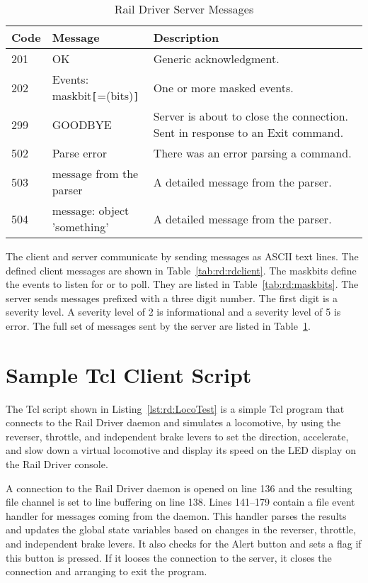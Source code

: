 \begin{table}[hbpt]
\begin{centering}  
\begin{tabular}{|l|l|p{2in}|}
\hline
\textbf{Code} & \textbf{Message} & \textbf{Description} \\
\hline
\hline
201 & OK & Generic acknowledgment.\\
\hline
202 & Events: maskbit\verb=[==(bits)\verb=]=& One or more masked events.\\
\hline
299 & GOODBYE & Server is about to close the connection.  Sent in
response to an Exit command.\\
\hline
502 & Parse error& There was an error parsing a command.\\
\hline
503 & message from the parser& A detailed message from the parser.\\
\hline
504 & message: object 'something'& A detailed message from the parser.\\
\hline
\end{tabular}
\caption{Rail Driver Server Messages}
\label{tab:rd:rdserver}
\end{centering}
\end{table}
The client and server communicate by sending messages as ASCII text
lines.  The defined client messages are shown in
Table~\ref{tab:rd:rdclient}. The maskbits define the events to listen for
or to poll.  They are listed in Table~\ref{tab:rd:maskbits}. The server
sends messages prefixed with a three digit number.  The first digit is a
severity level. A severity level of 2 is informational and a
severity level of 5 is error.  The full set of messages sent by the
server are listed in Table~\ref{tab:rd:rdserver}.

\section{Sample Tcl Client Script}


The Tcl script shown in Listing~\ref{lst:rd:LocoTest} is a simple Tcl program
that connects to the Rail Driver daemon and simulates a locomotive, by
using the reverser, throttle, and independent brake levers to set the
direction, accelerate, and slow down a virtual locomotive and display
its speed on the LED display on the Rail Driver console.

A connection to the Rail Driver daemon is opened on line 136 and the
resulting file channel is set to line buffering on line 138.  Lines
141--179 contain a file event handler for messages coming from the
daemon.  This handler parses the results and updates the global state
variables based on changes in the reverser, throttle, and independent
brake levers.  It also checks for the Alert button and sets a flag if
this button is pressed.  If it looses the connection to the server, it
closes the connection and arranging to exit the program.

